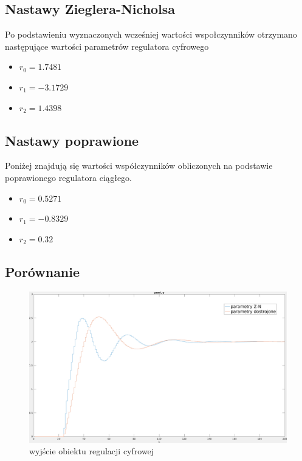 \documentclass[fleqn]{article}
\begin{document}
\subsection{Nastawy Zieglera-Nicholsa}

Po podstawieniu wyznaczonych wcześniej wartości wspołczynników otrzymano następujące wartości parametrów regulatora cyfrowego
\begin{itemize}
	\item $r_0 = 1.7481$
	\item $r_1 = -3.1729$
	\item $r_2 = 1.4398$
\end{itemize}


\subsection{Nastawy poprawione}
Poniżej znajdują się wartości współczynników obliczonych na podstawie poprawionego regulatora ciągłego.
\begin{itemize}
	\item $r_0 = 0.5271$
	\item $r_1 = -0.8329$
	\item $r_2 = 0.32$
\end{itemize}

\subsection{Porównanie}
\begin{figure}[H]
	\includegraphics[width=\textwidth]{scripts/dyskretwyj.png}
	\caption{wyjście obiektu regulacji cyfrowej}
\end{figure}
\end{document}
